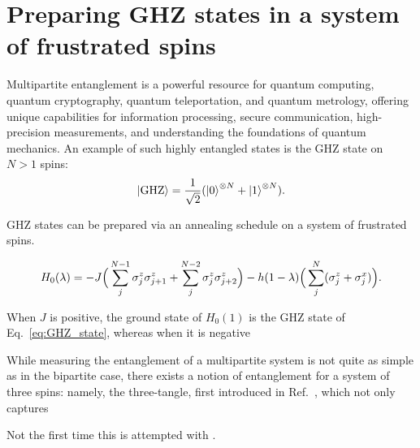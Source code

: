 \section{Preparing GHZ states in a system of frustrated spins}\label{sec:6.4_ghz_states}

Multipartite entanglement is a powerful resource for quantum computing, quantum cryptography, quantum teleportation, and quantum metrology, offering unique capabilities for information processing, secure communication, high-precision measurements, and understanding the foundations of quantum mechanics. An example of such highly entangled states is the GHZ state on $N > 1$ spins:
\begin{equation}\label{eq:GHZ_state}
    \ket{\rm GHZ} = \frac{1}{\sqrt{2}} (\ket{0}^{\otimes N} + \ket{1}^{\otimes N}).
\end{equation}

GHZ states can be prepared via an annealing schedule on a system of frustrated spins. 

\begin{equation}\label{eq:ghz_hamiltonian}
    H_0(\lambda) = - J \Big( \sum_{j}^{N-1} \sigma^z_j \sigma^z_{j+1} + \sum_{j}^{N-2} \sigma^z_j \sigma^z_{j+2} \Big) - h(1 - \lambda) \Big( \sum_j^N (\sigma^z_j + \sigma^x_j) \Big).
\end{equation}

When $J$ is positive, the ground state of $H_0(1)$ is the GHZ state of Eq.~\ref{eq:GHZ_state}, whereas when it is negative 

While measuring the entanglement of a multipartite system is not quite as simple as in the bipartite case, there exists a notion of entanglement for a system of three spins: namely, the three-tangle, first introduced in Ref.~\cite{coffman_distributed_2000}, which not only captures 

Not the first time this is attempted with . \cite{sun_optimizing_2022}